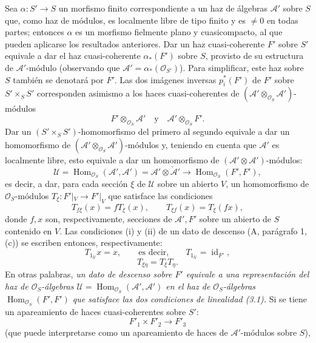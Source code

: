 Sea $\alpha:S'\longrightarrow S$ un morfismo finito correspondiente a un haz de
álgebras $\mathcal A'$ sobre $S$ que, como haz de módulos, es localmente libre
de tipo finito y es $\ne0$ en todas partes; entonces $\alpha$ es un morfismo
fielmente plano y cuasicompacto, al que pueden aplicarse los resultados
anteriores. Dar un haz cuasi-coherente $F'$ sobre $S'$ equivale a dar el haz
cuasi-coherente $\alpha_*(F')$ sobre $S$, provisto de su estructura de
$\mathcal A'$-módulo (observando que
$\mathcal A'=\alpha_*(\mathcal O_{S'})$). Para simplificar, este haz sobre $S$
también se denotará por $F'$. Las dos imágenes inversas $p_i^*(F')$ de $F'$
sobre $S'\times_SS'$ corresponden asimismo a los haces cuasi-coherentes de
$(\mathcal A'\otimes_{\mathcal O_S}\mathcal A')$-módulos
\[
  F'\otimes_{\mathcal O_S}\mathcal A'
  \quad\text{y}\quad
  \mathcal A'\otimes_{\mathcal O_S}F'.
\]
Dar un $(S'\times_SS')$-homomorfismo del primero al segundo equivale a dar un
homomorfismo de $(\mathcal A'\otimes_{\mathcal O_S}\mathcal A')$-módulos y,
teniendo en cuenta que $\mathcal A'$ es localmente libre, esto equivale a dar
un homomorfismo de $(\mathcal A'\otimes\mathcal A')$-módulos:
\[
  \mathcal U=
  \operatorname{Hom}_{\mathcal O_S}(\mathcal A',\mathcal A')
  =\mathcal A'\otimes\check{\mathcal A}'
  \longrightarrow
  \operatorname{Hom}_{\mathcal O_S}(F',F'),
\]
es decir, a dar, para cada sección $\xi$ de $\mathcal U$ sobre un abierto $V$,
un homomorfismo de $\mathcal O_S$-módulos
$T_\xi:F'|_V\longrightarrow F'|_V$ que satisface las condiciones
\begin{equation}
  T_{f\xi}(x)=fT_\xi(x),
  \qquad T_{\xi f}(x)=T_\xi(fx),
  \tag{3.1}
\end{equation}
donde $f,x$ son, respectivamente, secciones de $\mathcal A',F'$ sobre un
abierto de $S$ contenido en $V$. Las condiciones (i) y (ii) de un dato de
descenso (A, parágrafo 1, (c)) se escriben entonces, respectivamente:
\begin{equation}
  T_{1_{\mathcal U}}x=x,
  \qquad\text{es decir,}\qquad
  T_{1_{\mathcal U}}=\operatorname{id}_{F'},
  \tag{3.2}
\end{equation}
\begin{equation}
  T_{\xi\eta}=T_\xi T_\eta.
  \tag{3.3}
\end{equation}
En otras palabras, \emph{un dato de descenso sobre $F'$ equivale a una
representación del haz de $\mathcal O_S$-álgebras
$\mathcal U=\operatorname{Hom}_{\mathcal O_S}(\mathcal A',\mathcal A')$ en el
haz de $\mathcal O_S$-álgebras
$\operatorname{Hom}_{\mathcal O_S}(F',F')$ que satisface las dos condiciones de
linealidad (3.1).} Si se tiene un apareamiento de haces cuasi-coherentes sobre
$S'$:
\[
  F'_1\times F'_2\longrightarrow F'_3
\]
(que puede interpretarse como un apareamiento de haces de
$\mathcal A'$-módulos sobre $S$),


